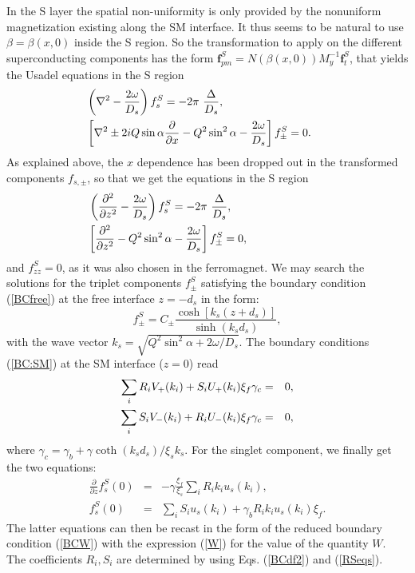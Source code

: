 \documentclass[prb,amsmath,amssymb,reprint]{revtex4-2}
\begin{document}
In the S layer the spatial non-uniformity is only provided by the
nonuniform magnetization existing along the SM interface. It thus seems to be natural to
use $\beta =\beta (x,0)$ inside the S region.  So the transformation to apply on the different superconducting components has the form
$\mathbf{f}_{pm }^S=N(\beta (x,0))M_{y}^{-1}
\mathbf{f}_{t}^S$, that yields the Usadel equations in the S region
\begin{eqnarray}
\left( \nabla ^{2}-\frac{2\omega }{D_{s}}\right) f_{s}^{S} =-2\pi \ \frac{%
\Delta }{D_{s}},  \notag \hspace*{3.3cm} \\
\left[ \nabla ^{2}\pm 2iQ\sin \alpha \frac{\partial }{\partial x}-Q^{2}\sin
^{2}\alpha -\frac{2\omega }{D_{s}}\right] f_{\pm }^{S} =0.  \hspace*{0.5cm}\label{UUs1}
\end{eqnarray}
As explained above, the $x$ dependence has been dropped out in the transformed components $f_{s,\pm}$,
so that we get the equations in the S region
\begin{eqnarray}
\left( \frac{\partial ^{2}}{\partial z^{2}}-\frac{2\omega }{D_{s}}\right)
f_{s}^{S} =-2\pi \ \frac{\Delta }{D_{s}},  \notag \hspace*{3cm} \\
\left[ \frac{\partial ^{2}}{\partial z^{2}}-Q^{2}\sin ^{2}\alpha -\frac{%
2\omega }{D_{s}}\right] f_{\pm }^{S} = 0,  \hspace*{2.5cm}\label{UUs2}
\end{eqnarray}
and  $f_{zz}^{S}=0$, as it was also chosen in the ferromagnet. We may search the solutions
for the triplet components $f_{\pm }^{S}$ satisfying the boundary condition (\ref{BCfree}) at
the free interface $z=-d_s$  in the form:
\begin{equation}
f_{\pm }^{S}=C_{\pm }\frac{\cosh [k_{s}(z+d_s)]}{\sinh (k_{s}d_s)},  \label{SolS}
\end{equation}
with the wave vector $k_{s}=\sqrt{Q^{2}\sin ^{2}\alpha+ 2\omega /D_{s}}$. The boundary conditions (\ref{BC:SM}) at the SM
interface ($z=0$)  read
\begin{eqnarray}
\sum\limits_{i}R_{i}V_{+}(k_{i})+S_{i}U_{+}(k_{i})\xi _{f}\gamma _{c} &=&0,
\notag \\
\sum\limits_{i}S_{i}V_{-}(k_{i})+R_{i}U_{-}(k_{i})\xi _{f}\gamma _{c} &=&0,
\label{RSeqs}
\end{eqnarray}
where $\gamma _{c}= \gamma _{b}+\gamma \coth (k_{s}d_{s})/\xi _{s}k_{s}$.
For the singlet component, we finally get the two equations:
\begin{eqnarray}
\frac{\partial }{\partial z}f_{s}^{S}(0) &=&-\gamma \frac{\xi _{f}}{\xi _{s}}%
\sum\limits_{i}R_{i} k_i u_{s}(k_{i}), \nonumber \\
f_{s}^{S}(0) &=&\sum\limits_{i}S_{i}u_{s}(k_{i})+\gamma
_{b}R_{i}k _i u_{s}(k_{i})\xi _{f}. \label{final}
\end{eqnarray}
The latter equations can then be recast in the form of the reduced boundary
condition (\ref{BCW}) with the expression (\ref{W})
for the value of the quantity $W$. The coefficients $R_{i},S_{i}$ are determined by
using Eqs. (\ref{BCdf2}) and (\ref{RSeqs}).
\end{document}
